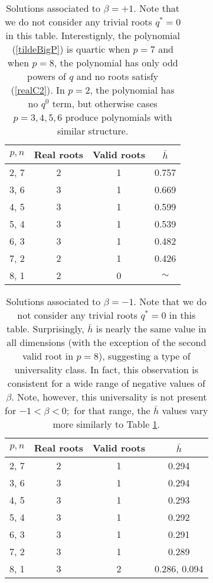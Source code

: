 \documentclass[amsmath,amssymb,11pt]{article}
\begin{document}
\begin{table}[H]
\begin{center}
\begin{tabular}{c| c | c | c }
$p,n$  & Real roots & Valid roots & $\bar{h}$ \\ \hline 
2, 7 & 2 & 1 & 0.757 \\
3, 6 & 3 & 1 & 0.669  \\
4, 5 & 3 & 1 & 0.599  \\
5, 4 &  3& 1 & 0.539 \\
6, 3 & 3 & 1 & 0.482  \\
7, 2 & 2 &1 & 0.426  \\
8, 1 & 2 & 0 & $\sim$ 
\end{tabular}
\end{center}
\caption{Solutions associated to $\beta=+1.$ Note that we do not consider any trivial roots $q^*=0$ in this table. Interestignly, the polynomial (\ref{tildeBigP}) is quartic when $p=7$ and when $p=8$, the polynomial has only odd powers of $q$ and no roots satisfy (\ref{realC2}). In $p=2$, the polynomial has no $q^0$ term, but otherwise cases $p=3,4,5,6$ produce polynomials with similar structure. }
\label{betaplustable}
\end{table}


\begin{table}[H]
\begin{center}
\begin{tabular}{c| c | c | c }
$p,n$  & Real roots & Valid roots & $\bar{h}$ \\ \hline 
2, 7 & 2 & 1 & 0.294 \\
3, 6 & 3 & 1 & 0.294  \\
4, 5 & 3 & 1 & 0.293  \\
5, 4 &  3& 1 & 0.292 \\
6, 3 & 3 & 1 & 0.291  \\
7, 2 & 3 &1 & 0.289 \\
8, 1 & 3 & 2 & 0.286, 0.094 
\end{tabular}
\end{center}
\caption{Solutions associated to $\beta=-1.$ Note that we do not consider any trivial roots $q^*=0$ in this table. Surprisingly, $\bar{h}$ is nearly the same value in all dimensions (with the exception of the second valid root in $p=8$), suggesting a type of universality class. In fact, this observation is consistent for a wide range of negative values of $\beta$. Note, however, this universality is not present for $-1<\beta<0;$ for that range, the $\bar{h}$ values vary more similarly to Table \ref{betaplustable}.}
\label{betaminustable}
\end{table}
\end{document}

